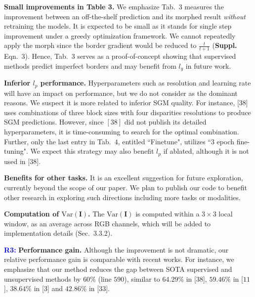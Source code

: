 \documentclass[10pt,twocolumn,letterpaper]{article}
\newcommand{\Paragraph}[1]{\vspace{0.40mm} \noindent \textbf{#1} \hspace{0mm}}
\begin{document}
\Paragraph{Small improvements in Table 3.} 
We emphasize Tab.~$3$ measures the improvement between an off-the-shelf prediction and its morphed result {\it without} retraining the models. 
It is expected to be small as it stands for single step improvement under a greedy optimization framework. 
We cannot repeatedly apply the morph since the border gradient would be reduced to $\frac{t}{t+1}$ (\textbf{Suppl.} Eqn.~$3$).
Hence, Tab.~$3$ serves as a proof-of-concept  showing that supervised methods predict imperfect borders and may benefit from $l_g$ in future work. 

\Paragraph{Inferior ${l_p}$ performance.} 
Hyperparameters such as resolution and learning rate will have an impact on performance, but we do not consider as the dominant reasons. 
We suspect it is more related to inferior SGM quality.
For instance, [$38$] uses combinations of three block sizes with four disparities resolutions to produce SGM predictions. 
However, since $[38]$ did not publish its detailed hyperparameters, it is time-consuming to search for the optimal combination. 
Further, only the last entry in Tab.~$4$, entitled ``Finetune", utilizes ``$3$ epoch fine-tuning". 
We expect this strategy may also benefit $l_p$ if ablated, although it is not used in [$38$]. %

\Paragraph{Benefits for other tasks.} 
It is an excellent suggestion for future exploration, currently beyond the scope of our paper. 
We plan to publish our code to benefit other research in exploring such directions including more tasks or modalities.

\Paragraph{Computation of $\text{Var}(\mathbf{I})$. } 
The $\text{Var}(\mathbf{I})$ is computed within a $3 \times 3$ local window, as an average across RGB channels, which will be added to implementation details (Sec.~$3.3.2$).

\Paragraph{\textcolor{blue}{R3:}}
\Paragraph{Performance gain.} 
Although the improvement is not dramatic, our relative performance gain is comparable with recent works.
For instance, we emphasize that our method reduces the gap between SOTA supervised and unsupervised methods by $60\%$ (line $590$), similar to $64.29\%$ in [$38$], $59.46\%$ in [$11$], $38.64\%$ in [$3$] and $42.86\%$ in [$33$]. 
\end{document}
